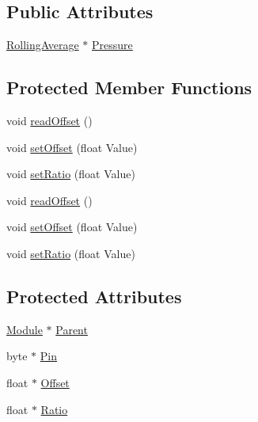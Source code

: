 \subsection*{Public Attributes}
\begin{DoxyCompactItemize}
\item 
\hyperlink{class_rolling_average}{Rolling\+Average} $\ast$ \hyperlink{class_pressure_sensor_a7da13aa07030a312642b44d6934f3210}{Pressure}
\end{DoxyCompactItemize}
\subsection*{Protected Member Functions}
\begin{DoxyCompactItemize}
\item 
void \hyperlink{class_pressure_sensor_a9a97fa923ea86256eadff802549f0081}{read\+Offset} ()
\item 
void \hyperlink{class_pressure_sensor_af4ea57467bb0d6ae89b0f1a65c7863da}{set\+Offset} (float Value)
\item 
void \hyperlink{class_pressure_sensor_a5c46cbf770e053a41dad7ee63549ae7e}{set\+Ratio} (float Value)
\item 
void \hyperlink{class_pressure_sensor_a9a97fa923ea86256eadff802549f0081}{read\+Offset} ()
\item 
void \hyperlink{class_pressure_sensor_af4ea57467bb0d6ae89b0f1a65c7863da}{set\+Offset} (float Value)
\item 
void \hyperlink{class_pressure_sensor_a5c46cbf770e053a41dad7ee63549ae7e}{set\+Ratio} (float Value)
\end{DoxyCompactItemize}
\subsection*{Protected Attributes}
\begin{DoxyCompactItemize}
\item 
\hyperlink{class_module}{Module} $\ast$ \hyperlink{class_pressure_sensor_a5f3f58f1dd495b1acf664f18d7566d22}{Parent}
\item 
byte $\ast$ \hyperlink{class_pressure_sensor_a101279a910166f7795303d9ff7279ece}{Pin}
\item 
float $\ast$ \hyperlink{class_pressure_sensor_a011d68d29e88331d18de6dd83c2e8866}{Offset}
\item 
float $\ast$ \hyperlink{class_pressure_sensor_a10d297dbbef3bf72ec49c99ca6acaeaa}{Ratio}
\end{DoxyCompactItemize}


